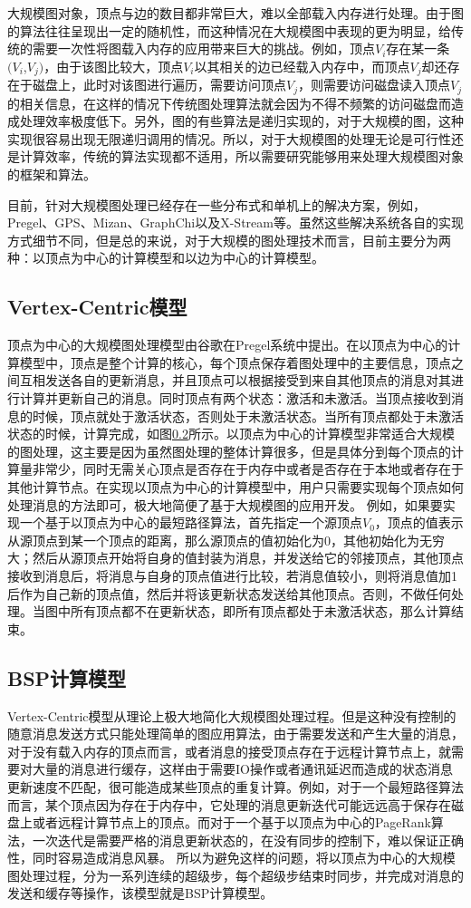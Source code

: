 大规模图对象，顶点与边的数目都非常巨大，难以全部载入内存进行处理。由于图的算法往往呈现出一定的随机性，而这种情况在大规模图中表现的更为明显，给传统的需要一次性将图载入内存的应用带来巨大的挑战。例如，顶点$V_i$存在某一条$(V_i$,$V_j)$，由于该图比较大，顶点$V_i$以其相关的边已经载入内存中，而顶点$V_j$却还存在于磁盘上，此时对该图进行遍历，需要访问顶点$V_j$，则需要访问磁盘读入顶点$V_j$的相关信息，在这样的情况下传统图处理算法就会因为不得不频繁的访问磁盘而造成处理效率极度低下。另外，图的有些算法是递归实现的，对于大规模的图，这种实现很容易出现无限递归调用的情况。所以，对于大规模图的处理无论是可行性还是计算效率，传统的算法实现都不适用，所以需要研究能够用来处理大规模图对象的框架和算法。

目前，针对大规模图处理已经存在一些分布式和单机上的解决方案，例如，Pregel、GPS、Mizan、GraphChi以及X-Stream等。虽然这些解决系统各自的实现方式细节不同，但是总的来说，对于大规模的图处理技术而言，目前主要分为两种：以顶点为中心的计算模型和以边为中心的计算模型。

\subsection{Vertex-Centric模型}
顶点为中心的大规模图处理模型由谷歌在Pregel系统中提出。在以顶点为中心的计算模型中，顶点是整个计算的核心，每个顶点保存着图处理中的主要信息，顶点之间互相发送各自的更新消息，并且顶点可以根据接受到来自其他顶点的消息对其进行计算并更新自己的消息。同时顶点有两个状态：激活和未激活。当顶点接收到消息的时候，顶点就处于激活状态，否则处于未激活状态。当所有顶点都处于未激活状态的时候，计算完成，如图\ref{}所示。以顶点为中心的计算模型非常适合大规模的图处理，这主要是因为虽然图处理的整体计算很多，但是具体分到每个顶点的计算量非常少，同时无需关心顶点是否存在于内存中或者是否存在于本地或者存在于其他计算节点。在实现以顶点为中心的计算模型中，用户只需要实现每个顶点如何处理消息的方法即可，极大地简便了基于大规模图的应用开发。
例如，如果要实现一个基于以顶点为中心的最短路径算法，首先指定一个源顶点$V_0$，顶点的值表示从源顶点到某一个顶点的距离，那么源顶点的值初始化为0，其他初始化为无穷大；然后从源顶点开始将自身的值封装为消息，并发送给它的邻接顶点，其他顶点接收到消息后，将消息与自身的顶点值进行比较，若消息值较小，则将消息值加1后作为自己新的顶点值，然后并将该更新状态发送给其他顶点。否则，不做任何处理。当图中所有顶点都不在更新状态，即所有顶点都处于未激活状态，那么计算结束。

\subsection{BSP计算模型}
Vertex-Centric模型从理论上极大地简化大规模图处理过程。但是这种没有控制的随意消息发送方式只能处理简单的图应用算法，由于需要发送和产生大量的消息，对于没有载入内存的顶点而言，或者消息的接受顶点存在于远程计算节点上，就需要对大量的消息进行缓存，这样由于需要IO操作或者通讯延迟而造成的状态消息更新速度不匹配，很可能造成某些顶点的重复计算。例如，对于一个最短路径算法而言，某个顶点因为存在于内存中，它处理的消息更新迭代可能远远高于保存在磁盘上或者远程计算节点上的顶点。而对于一个基于以顶点为中心的PageRank算法，一次迭代是需要严格的消息更新状态的，在没有同步的控制下，难以保证正确性，同时容易造成消息风暴。
所以为避免这样的问题，将以顶点为中心的大规模图处理过程，分为一系列连续的超级步，每个超级步结束时同步，并完成对消息的发送和缓存等操作，该模型就是BSP计算模型。

